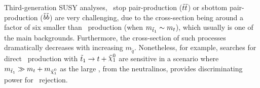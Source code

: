 				Third-generation \ac{SUSY} analyses, \eg\ stop pair-production ($\tilde{t}\tilde{t}$) or sbottom pair-production ($\tilde{b}\tilde{b}$) are very challenging, due to the cross-section being around a factor of six smaller than \ttbar\ production (when $m_{\tilde{t}_1} \sim m_t$), which usually is one of the main backgrounds. Furthermore, the cross-section of such processes dramatically decreases with increasing $m_{\tilde{q}}$. Nonetheless, for example, searches for direct \stopone\ production with $\stopone \ra t + \ninoone$ are sensitive in a scenario where $m_{\stopone} \gg m_t + m_{\ninoone}$ as the large \met, from the neutralinos, provides discriminating power for \ttbar\ rejection.
				